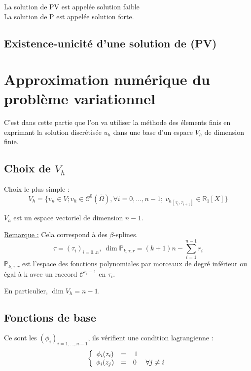 La solution de PV est appelée solution faible \\
La solution de P est appelée solution forte.

\subsection{Existence-unicité d'une solution de (PV)}


\section{Approximation numérique du problème variationnel}
C'est dans cette partie que l'on va utiliser la méthode des élements finis en exprimant la solution discrétisée $u_h$ dans une base d'un espace $V_h$ de dimension finie.

\subsection{Choix de $V_h$}
Choix le plus simple :
\[V_h=\{v_n\in V; v_h\in\mathcal{C}^0(\bar\Omega), \forall i=0,...,n-1;\ {v_h}_{[\tau_i,\tau_{i+1}]}\in\mathbb{R}_1[X]\}\]

$V_h$ est un espace vectoriel de dimension $n-1$. 

\bigskip
\underline{Remarque :} Cela correspond à des $\beta$-splines.
\[\tau=(\tau_i)_{i=0..n},\ \dim \mathbb{P}_{k,\tau,r}=(k+1)n-\sum_{i=1}^{n-1} r_i\]
$\mathbb{P}_{k,\tau,r}$ est l'espace des fonctions polynomiales par morceaux de degré inférieur ou égal à k avec un raccord $\mathcal{C}^{r_i-1}$ en $\tau_i$.

\bigskip
En particulier, $\dim V_h=n-1$.

\subsection{Fonctions de base}
Ce sont les $(\phi_i)_{i=1,...,n-1}$, ils vérifient une condition lagrangienne :
\[\left\{\begin{array}{c c c c}
\phi_i(z_i)&=&1 & \\
\phi_i(z_j)&=&0\ & \forall j\neq i
\end{array}\right.\]

